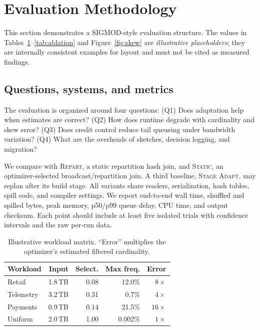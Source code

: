 \section{Evaluation Methodology}
\label{sec:evaluation}

This section demonstrates a SIGMOD-style evaluation structure.  The values in
Tables~\ref{tab:workloads}--\ref{tab:ablation} and
Figure~\ref{fig:skew} are \emph{illustrative placeholders}; they are internally
consistent examples for layout and must not be cited as measured findings.

\subsection{Questions, systems, and metrics}

The evaluation is organized around four questions: (Q1) Does adaptation help
when estimates are correct?  (Q2) How does runtime degrade with cardinality and
skew error?  (Q3) Does credit control reduce tail queueing under bandwidth
variation?  (Q4) What are the overheads of sketches, decision logging, and
migration?

We compare \system{} with \textsc{Repart}, a static repartition hash join, and
\textsc{Static}, an optimizer-selected broadcast/repartition join.  A third
baseline, \textsc{Stage Adapt}, may replan after its build stage.
All variants share readers, serialization, hash tables, spill code, and
compiler settings.  We report end-to-end wall time, shuffled and spilled bytes,
peak memory, p50/p99 queue delay, CPU time, and output checksum.  Each point
should include at least five isolated trials with confidence intervals and the
raw per-run data.

\begin{table}[t]
  \caption{Illustrative workload matrix.  ``Error'' multiplies the optimizer's
  estimated filtered cardinality.}
  \label{tab:workloads}
  \centering
  \small
  \begin{tabular}{@{}lrrrr@{}}
    \toprule
    Workload & Input & Select. & Max freq. & Error \\
    \midrule
    Retail    & 1.8\,TB & 0.08 & 12.0\% & $8\times$ \\
    Telemetry & 3.2\,TB & 0.31 &  0.7\% & $4\times$ \\
    Payments  & 0.9\,TB & 0.14 & 21.5\% & $16\times$ \\
    Uniform   & 2.0\,TB & 1.00 &  0.002\% & $1\times$ \\
    \bottomrule
  \end{tabular}
\end{table}


